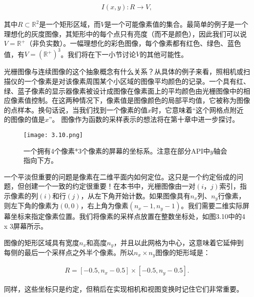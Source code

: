 \documentclass[lang=cn,12pt]{elegantbook}
\begin{document}


\[
  \begin{aligned}
  I(x,y):R\rightarrow V,
  \end{aligned}
\]

其中$R\subset \mathbb{R} ^2$是一个矩形区域，而$V$是一个可能像素值的集合。最简单的例子是一个理想化的灰度图像，其矩形中的每个点只有亮度（而不是颜色），因此我们可以说$V=\mathbb{R}^{+}$（非负实数）。一幅理想化的彩色图像，每个像素都有红色、绿色、蓝色值，有$V=(\mathbb{R}^{+})^3$。我们将在下一小节讨论$V$的其他可能性。


光栅图像与连续图像的这个抽象概念有什么关系？从具体的例子来看，照相机或扫描仪的一个像素是对该像素周围某个小区域的图像平均颜色的记录。一个具有红、绿、蓝子像素的显示器像素被设计成图像在像素面上的平均颜色由光栅图像中的相应像素值控制。在这两种情况下，像素值是图像颜色的局部平均值，它被称为图像的点样本。换句话说，当我们找到一个像素的值$x$时，它意味着“这个网格点附近的图像的值是$x$”。 图像作为函数的采样表示的想法将在第十章中进一步探讨。

\begin{figure}[htb]
  \centering
  \texttt{[image: 3.10.png]}
  \caption{一个拥有4个像素*3个像素的屏幕的坐标系。注意在部分API中$y$轴会指向下方。}
\end{figure}

一个平淡但重要的问题是像素在二维平面内如何定位。这只是一个约定俗成的问题，但创建一个一致的约定很重要！在本书中，光栅图像由一对$(i，j)$索引，指示像素的列$(i)$和行$(j)$，从左下角开始计数。如果图像具有$n_x$列、$n_y$行像素，则左下角的像素为$(0,0)$，右上角为像素$(n_x-1,n_y-1)$。我们需要二维实际屏幕坐标来指定像素位置。我们将像素的采样点放置在整数坐标处，如图3.10中的4 x 3屏幕所示。


图像的矩形区域具有宽度$n_x$和高度$n_y$，并且以此网格为中心，这意味着它延伸到每侧的最后一个采样点之外半个像素。所以$n_x \times n_y$图像的矩形域是：

\[
  \begin{aligned}
  R=[-0.5,n_x-0.5]\times [-0.5,n_y-0.5].
  \end{aligned}
\]

同样，这些坐标只是约定，但稍后在实现相机和视图变换时记住它们非常重要。

\end{document}
